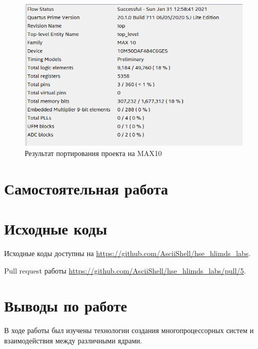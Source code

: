 \documentclass[a4paper,14pt]{article}
\begin{document}
    \begin{figure}[H]
		\centering
		\includegraphics[width=\linewidth]{images/main_max10}
		\caption{Результат портирования проекта на MAX10}
		\label{fig:main_max10}
	\end{figure}

    \section{Самостоятельная работа}



    \section{Исходные коды}

    Исходные коды доступны на \href{https://github.com/AsciiShell/hse_hlimds_labs}
    {https://github.com/AsciiShell/hse\_hlimds\_labs}.

    Pull request работы \href{https://github.com/AsciiShell/hse_hlimds_labs/pull/5}
    {https://github.com/AsciiShell/hse\_hlimds\_labs/pull/5}.


    \section{Выводы по работе}

    В ходе работы был изучены технологии создания многопроцессорных систем и взаимодействия между различными ядрами.
\end{document}
